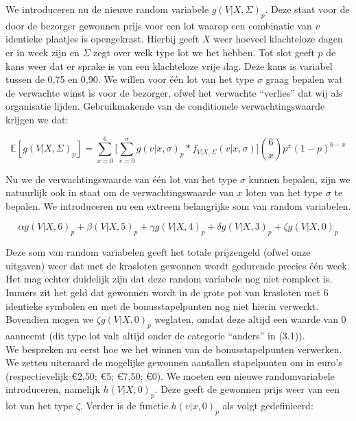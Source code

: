 We introduceren nu de nieuwe random variabele $g(V|X,\Sigma)_{p}$. Deze staat voor de door de bezorger gewonnen prijs voor een lot waarop een combinatie van $v$ identieke plaatjes is opengekrast. Hierbij geeft $X$ weer hoeveel klachteloze dagen er in week zijn en $\Sigma$ zegt over welk type lot we het hebben. Tot slot geeft $p$ de kans weer dat er sprake is van een klachteloze vrije dag. Deze kans is variabel tussen de 0,75 en 0,90. We willen voor één lot van het type $\sigma$ graag bepalen wat de verwachte winst is voor de bezorger, ofwel het verwachte ``verlies'' dat wij als organisatie lijden. Gebruikmakende van de conditionele verwachtingswaarde krijgen we dat:

\begin{equation}
  \mathbb{E}[g(V|X,\Sigma)_{p}] = \sum_{x=0}^{6} \Bigg[ \sum_{v=0}^{\sigma} g(v|x,\sigma)_{p} * f_{V|X,\Sigma}(v|x,\sigma) \Bigg] \binom{6}{x} p^{x}(1-p)^{6-x}
\end{equation}

Nu we de verwachtingswaarde van één lot van het type $\sigma$ kunnen bepalen, zijn we natuurlijk ook in staat om de verwachtingswaarde van $x$ loten van het type $\sigma$ te bepalen. We introduceren nu een extreem belangrijke som van random variabelen.

\begin{equation}
\alpha g(V|X,6)_{p} + \beta(V|X,5)_{p} + \gamma g(V|X,4)_{p} + \delta g(V|X,3)_{p} + \zeta g(V|X,0)_{p}
\end{equation}

Deze som van random variabelen geeft het totale prijzengeld (ofwel onze uitgaven) weer dat met de krasloten gewonnen wordt gedurende precies één week. Het mag echter duidelijk zijn dat deze random variabele nog niet compleet is. Immers zit het geld dat gewonnen wordt in de grote pot van krasloten met 6 identieke symbolen en met de bonusstapelpunten nog niet hierin verwerkt. Bovendien mogen we $\zeta g(V|X,0)_{p}$ weglaten, omdat deze altijd een waarde van 0 aanneemt (dit type lot valt altijd onder de categorie ``anders'' in (3.1)).\\

We bespreken nu eerst hoe we het winnen van de bonusstapelpunten verwerken. We zetten uiteraard de mogelijke gewonnen aantallen stapelpunten om in euro's (respectievelijk \euro2,50; \euro5; \euro7,50; \euro0). We moeten een nieuwe randomvariabele introduceren, namelijk $h(V|X,0)_{p}$. Deze geeft de gewonnen prijs weer van een lot van het type $\zeta$. Verder is de functie $h(v|x,0)_{p}$ als volgt gedefinieerd:


